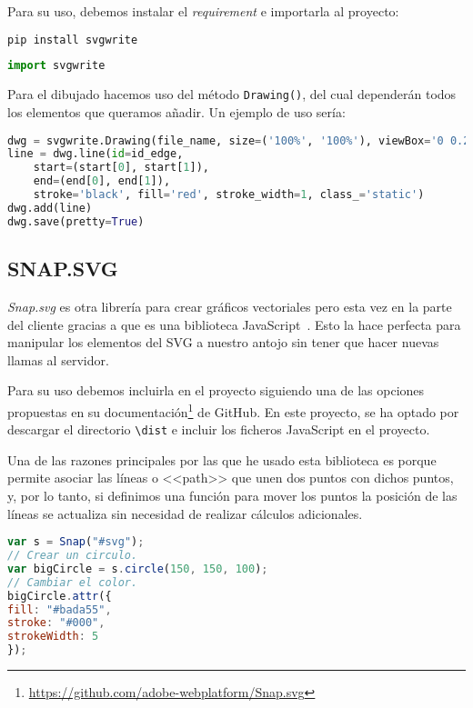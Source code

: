Para su uso, debemos instalar el \textit{requirement} e importarla al proyecto:
\renewcommand{\lstlistingname}{SVGWRITE}
\renewcommand{\lstlistlistingname}{List of \lstlistingname s}
\begin{lstlisting}[language=python,caption={Instalación mediante pip.}]
pip install svgwrite
\end{lstlisting}
\begin{lstlisting}[language=python,caption={Importación.}]
import svgwrite
\end{lstlisting}

Para el dibujado hacemos uso del método \texttt{Drawing()}, del cual dependerán todos los elementos que queramos añadir. Un ejemplo de uso sería:
\begin{lstlisting}[language=python,caption={Ejemplo de uso.}]
dwg = svgwrite.Drawing(file_name, size=('100%', '100%'), viewBox='0 0.2 1 1.5', profile='full')
line = dwg.line(id=id_edge,
	start=(start[0], start[1]),
	end=(end[0], end[1]),
	stroke='black', fill='red', stroke_width=1, class_='static')
dwg.add(line)	
dwg.save(pretty=True)
\end{lstlisting}



\subsection{SNAP.SVG}\label{snapsvg}
\textit{Snap.svg} es otra librería para crear gráficos vectoriales pero esta vez en la parte del cliente gracias a que es una biblioteca JavaScript~\cite{doc:snapsvg}. Esto la hace perfecta para manipular los elementos del SVG a nuestro antojo sin tener que hacer nuevas llamas al servidor.

Para su uso debemos incluirla en el proyecto siguiendo una de las opciones propuestas en su documentación\footnote{\url{https://github.com/adobe-webplatform/Snap.svg}} de GitHub. En este proyecto, se ha optado por descargar el directorio \texttt{\textbackslash{dist}} e incluir los ficheros JavaScript en el proyecto.

Una de las razones principales por las que he usado esta biblioteca es porque permite asociar las líneas o <<path>> que unen dos puntos con dichos puntos, y, por lo tanto, si definimos una función para mover los puntos la posición de las líneas se actualiza sin necesidad de realizar cálculos adicionales.
\renewcommand{\lstlistingname}{Snap.svg}
\renewcommand{\lstlistlistingname}{List of \lstlistingname s}
\begin{lstlisting}[language=javascript,caption={Ejemplo}]
var s = Snap("#svg");
// Crear un circulo.
var bigCircle = s.circle(150, 150, 100);
// Cambiar el color.
bigCircle.attr({
fill: "#bada55",
stroke: "#000",
strokeWidth: 5
});
\end{lstlisting}


